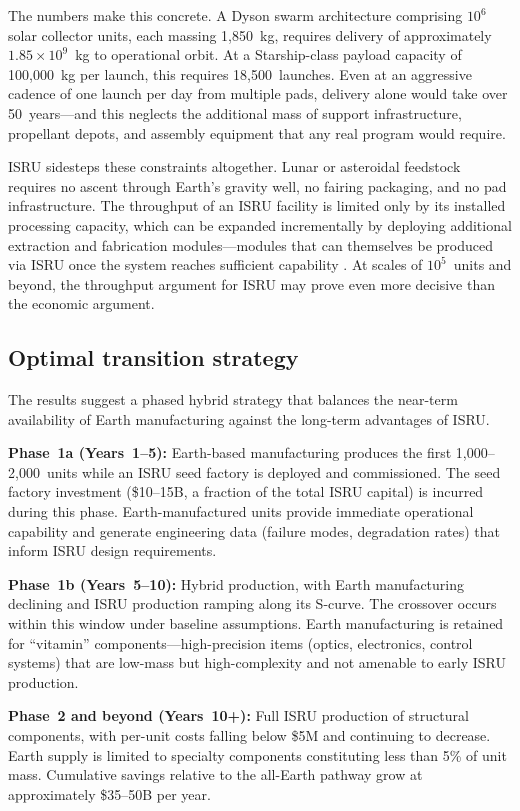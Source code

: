 \documentclass[preprint,12pt]{elsarticle}
\begin{document}
The numbers make this concrete. A Dyson swarm architecture comprising $10^6$ solar collector units, each massing 1{,}850~kg, requires delivery of approximately $1.85 \times 10^9$~kg to operational orbit. At a Starship-class payload capacity of 100{,}000~kg per launch, this requires 18{,}500~launches. Even at an aggressive cadence of one launch per day from multiple pads, delivery alone would take over 50~years---and this neglects the additional mass of support infrastructure, propellant depots, and assembly equipment that any real program would require.

ISRU sidesteps these constraints altogether. Lunar or asteroidal feedstock requires no ascent through Earth's gravity well, no fairing packaging, and no pad infrastructure. The throughput of an ISRU facility is limited only by its installed processing capacity, which can be expanded incrementally by deploying additional extraction and fabrication modules---modules that can themselves be produced via ISRU once the system reaches sufficient capability \cite{metzger2013}. At scales of $10^5$~units and beyond, the throughput argument for ISRU may prove even more decisive than the economic argument.

\subsection{Optimal transition strategy}

The results suggest a phased hybrid strategy that balances the near-term availability of Earth manufacturing against the long-term advantages of ISRU.

\textbf{Phase~1a (Years~1--5):} Earth-based manufacturing produces the first 1{,}000--2{,}000~units while an ISRU seed factory is deployed and commissioned. The seed factory investment (\$10--15B, a fraction of the total ISRU capital) is incurred during this phase. Earth-manufactured units provide immediate operational capability and generate engineering data (failure modes, degradation rates) that inform ISRU design requirements.

\textbf{Phase~1b (Years~5--10):} Hybrid production, with Earth manufacturing declining and ISRU production ramping along its S-curve. The crossover occurs within this window under baseline assumptions. Earth manufacturing is retained for ``vitamin'' components---high-precision items (optics, electronics, control systems) that are low-mass but high-complexity and not amenable to early ISRU production.

\textbf{Phase~2 and beyond (Years~10+):} Full ISRU production of structural components, with per-unit costs falling below \$5M and continuing to decrease. Earth supply is limited to specialty components constituting less than 5\% of unit mass. Cumulative savings relative to the all-Earth pathway grow at approximately \$35--50B per year.
\end{document}
